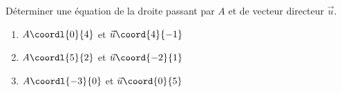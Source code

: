\begin{exo}{}
	Déterminer une équation de la droite passant par $A$ et de vecteur directeur $\vec{u}$.
	\begin{enumerate}
		\item $A\coordl{0}{4}$ et $\vec{u}\coord{4}{-1}$
		\item $A\coordl{5}{2}$ et $\vec{u}\coord{-2}{1}$
		\item $A\coordl{-3}{0}$ et $\vec{u}\coord{0}{5}$
	\end{enumerate}
\end{exo}
